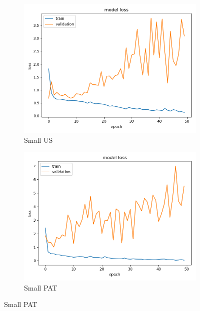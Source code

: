 \begin{figure}
\centering
\begin{subfigure}[b]{.45\linewidth}
\includegraphics[width=\linewidth]{Figs/small_us_loss.jpg}
\caption{Small US}
\end{subfigure}
\begin{subfigure}[b]{.45\linewidth}
\includegraphics[width=\linewidth]{Figs/small_pat_loss.jpg}
\caption{Small PAT}
\end{subfigure}


\end{figure}
